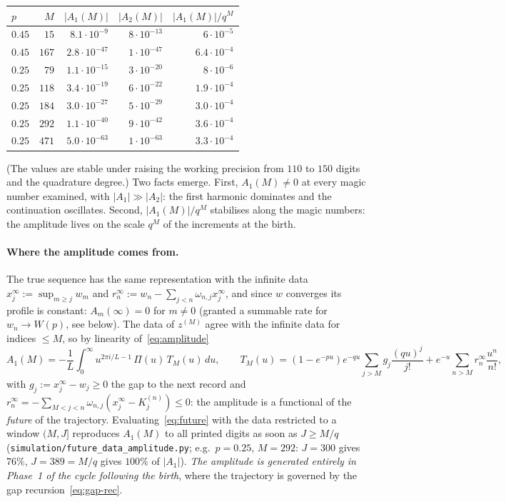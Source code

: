 \documentclass[11pt]{article}
\theoremstyle{definition}
\begin{document}
\begin{center}
\begin{tabular}{@{}lrrrr@{}}
\toprule
$p$ & $M$ & $|A_1(M)|$ & $|A_2(M)|$ & $|A_1(M)|/q^M$ \\
\midrule
$0.45$ & $15$  & $8.1\cdot10^{-9}$  & $8\cdot10^{-13}$ & $6\cdot10^{-5}$ \\
$0.45$ & $167$ & $2.8\cdot10^{-47}$ & $1\cdot10^{-47}$ & $6.4\cdot10^{-4}$ \\
$0.25$ & $79$  & $1.1\cdot10^{-15}$ & $3\cdot10^{-20}$ & $8\cdot10^{-6}$ \\
$0.25$ & $118$ & $3.4\cdot10^{-19}$ & $6\cdot10^{-22}$ & $1.9\cdot10^{-4}$ \\
$0.25$ & $184$ & $3.0\cdot10^{-27}$ & $5\cdot10^{-29}$ & $3.0\cdot10^{-4}$ \\
$0.25$ & $292$ & $1.1\cdot10^{-40}$ & $9\cdot10^{-42}$ & $3.6\cdot10^{-4}$ \\
$0.25$ & $471$ & $5.0\cdot10^{-63}$ & $1\cdot10^{-63}$ & $3.3\cdot10^{-4}$ \\
\bottomrule
\end{tabular}
\end{center}
(The values are stable under raising the working precision from $110$
to $150$ digits and the quadrature degree.)  Two facts emerge.  First,
$A_1(M)\ne0$ at every magic number examined, with $|A_1|\gg|A_2|$: the
first harmonic dominates and the continuation oscillates.  Second,
$|A_1(M)|/q^M$ stabilises along the magic numbers: the amplitude lives
on the scale $q^M$ of the increments at the birth.

\paragraph{Where the amplitude comes from.}  The true sequence has the
same representation with the infinite data $x_j^\infty:=\sup_{m\ge j}w_m$
and $r_n^\infty:=w_n-\sum_{j<n}\omega_{n,j}x_j^\infty$, and since $w$
converges its profile is constant: $A_m(\infty)=0$ for $m\ne0$
(granted a summable rate for $w_n\to W(p)$, see below).  The data of
$z^{(M)}$ agree with the infinite data for indices $\le M$, so by
linearity of~\eqref{eq:amplitude}
\begin{equation}\label{eq:future}
  A_1(M)=-\frac1L\int_0^\infty u^{2\pi i/L-1}\,\Pi(u)\,T_M(u)\,du,
  \qquad
  T_M(u)=(1-e^{-pu})e^{-qu}\!\sum_{j>M}g_j\frac{(qu)^j}{j!}
         +e^{-u}\!\sum_{n>M}r_n^\infty\frac{u^n}{n!},
\end{equation}
with $g_j:=x_j^\infty-w_j\ge0$ the gap to the next record and
$r_n^\infty=-\sum_{M<j<n}\omega_{n,j}(x_j^\infty-K_j^{(n)})\le0$: the
amplitude is a functional of the \emph{future} of the trajectory.
Evaluating~\eqref{eq:future} with the data restricted to a window
$(M,J]$ reproduces $A_1(M)$ to all printed digits as soon as
$J\ge M/q$ (\texttt{simulation/future\_data\_amplitude.py}; e.g.\
$p=0.25$, $M=292$: $J=300$ gives $76\%$, $J=389=M/q$ gives $100\%$ of
$|A_1|$).  \emph{The amplitude is generated entirely in Phase~1 of the
cycle following the birth}, where the trajectory is governed by the gap
recursion~\eqref{eq:gap-rec}.
\end{document}
